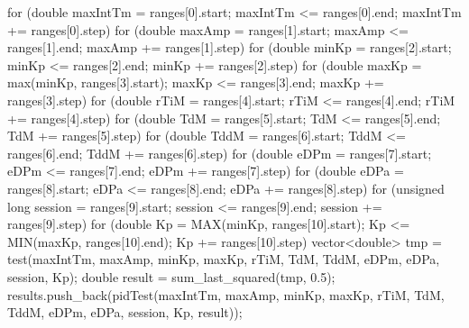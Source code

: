 \documentclass[a4paper,12pt]{report}
\begin{document}
\begin{lstlising}[language=C++]
\begin{lstlising}[language=C++]
{        for (double maxIntTm = ranges[0].start; maxIntTm <= ranges[0].end; maxIntTm += ranges[0].step)
        {
                for (double maxAmp = ranges[1].start; maxAmp <= ranges[1].end; maxAmp += ranges[1].step)
                {
                        for (double minKp = ranges[2].start; minKp <= ranges[2].end; minKp += ranges[2].step)
                        {
                                for (double maxKp = max(minKp, ranges[3].start);
                                         maxKp <= ranges[3].end; maxKp += ranges[3].step)
                                {
                                        for (double rTiM = ranges[4].start; rTiM <= ranges[4].end; rTiM += ranges[4].step)
                                        {
                                                for (double TdM = ranges[5].start; TdM <= ranges[5].end; TdM += ranges[5].step)
                                                {
                                                        for (double TddM = ranges[6].start; TddM <= ranges[6].end; TddM += ranges[6].step)
                                                        {
                                                                for (double eDPm = ranges[7].start; eDPm <= ranges[7].end; eDPm += ranges[7].step)
                                                                {
                                                                        for (double eDPa = ranges[8].start; eDPa <= ranges[8].end; eDPa += ranges[8].step)
                                                                        {
                                                                                for (unsigned long session = ranges[9].start; session <= ranges[9].end; session += ranges[9].step)
                                                                                {
                                                                                        for (double Kp = MAX(minKp, ranges[10].start);
                                                                                                 Kp <= MIN(maxKp, ranges[10].end); Kp += ranges[10].step)
                                                                                        {
                                                                                                vector<double> tmp = test(maxIntTm, maxAmp, minKp, maxKp, rTiM, TdM, TddM, eDPm, eDPa, session, Kp);
                                                                                                double result = sum_last_squared(tmp, 0.5);
                                                                                                results.push_back(pidTest({maxIntTm, maxAmp, minKp, maxKp, rTiM, TdM, TddM, eDPm, eDPa, session, Kp, result}));
}}}}}}}}}}}}
\end{lstlising}
\end{lstlising}
\end{document}
